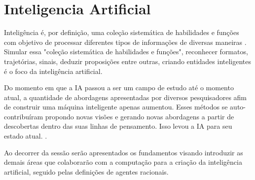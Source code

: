\section{Inteligencia Artificial}

Inteligência é, por definição, uma coleção sistemática de habilidades e funções com objetivo de processar diferentes tipos de informações de diversas maneiras \cite[49]{guilford1982cognitive}. Simular essa "coleção sistemática de habilidades e funções", reconhecer formatos, trajetórias, sinais, deduzir proposições entre outras, criando entidades inteligentes é o foco da inteligência artificial.

Do momento em que a IA passou a ser um campo de estudo até o momento atual, a quantidade de abordagens apresentadas por diversos pesquisadores afim de construir uma máquina inteligente apenas aumentou. Esses métodos se auto-contribuíram propondo novas visões e gerando novas abordagens a partir de descobertas dentro das suas linhas de pensamento. Isso levou a IA para seu estado atual. \cite[1-2]{russell2003artificial}.

Ao decorrer da sessão serão apresentados os fundamentos visando introduzir as demais áreas que colaborarão com a computação para a criação da inteligência artificial, seguido pelas definições de agentes racionais.



